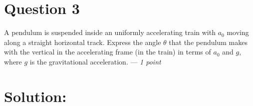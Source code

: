 \section*{Question 3}
A pendulum is suspended inside an uniformly accelerating train with $a_0$ moving along a straight horizontal track. Express the angle $\theta$  that the pendulum makes with the vertical in the accelerating frame (in the train) in terms of $a_0$ and $g$, where $g$ is the gravitational acceleration. --- \textit{1 point}

\section*{Solution:}